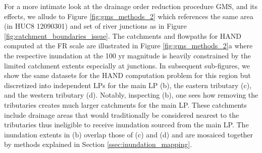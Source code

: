For a more intimate look at the drainage order reduction procedure GMS, and its effects, we allude to Figure \ref{fig:gms_methods_2} which references the same area (in HUC8 12090301) and set of river junctions as in Figure \ref{fig:catchment_boundaries_issue}.
The catchments and flowpaths for HAND computed at the FR scale are illustrated in Figure \ref{fig:gms_methods_2}a where the respective inundation at the 100 yr magnitude is heavily constrained by the limited catchment extents especially at junctions.
In subsequent sub-figures, we show the same datasets for the HAND computation problem for this region but discretized into independent LPs for the main LP (b), the eastern tributary (c), and the western tributary (d).
Notably, inspecting (b), one sees how removing the tributaries creates much larger catchments for the main LP. 
These catchments include drainage areas that would traditionally be considered nearest to the tributaries thus ineligible to receive inundation sourced from the main LP.
The inundation extents in (b) overlap those of (c) and (d) and are mosaiced together by methods explained in Section \ref{ssec:inundation_mapping}.
%
